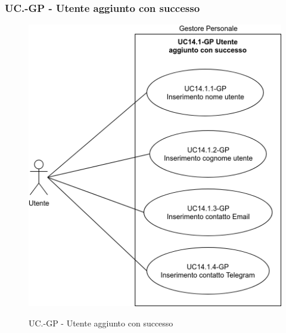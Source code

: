 	\subsubsection{UC\theuccount.\thesubuccount-GP - Utente aggiunto con successo}
		\begin{figure}[H]
			\centering
			\includegraphics[width=\columnwidth]{img/casi_d'uso/UC14_1.png}\\
			\caption{UC\theuccount.\thesubuccount-GP - Utente aggiunto con successo}
		\end{figure}

